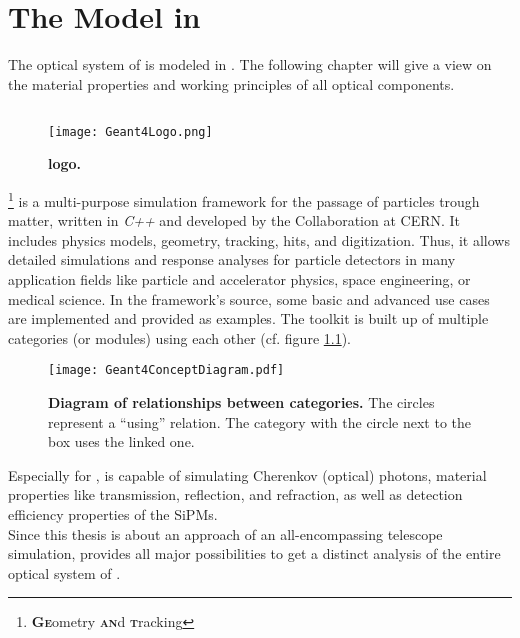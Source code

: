 \chapter{The \iceact Model in \geant}\label{chap:iceact_model}

The optical system of \iceact is modeled in \geant. The following chapter will give a view on the material properties and working principles of all optical components.

\section{\geant}

\begin{wrapfigure}{r}{0.5\textwidth}
	\centering
	\texttt{[image: Geant4Logo.png]}
	\caption[\geant logo]{\textbf{\geant logo.} \cite{geant4:logo}}	
\end{wrapfigure}
\geant\footnote{\textbf{\textsc{Ge}}ometry \textbf{\textsc{an}}d \textbf{\textsc{t}}racking} is a multi-purpose simulation framework for the passage of particles trough matter, written in \textit{C++} and developed by the \geant Collaboration at CERN. It includes physics models, geometry, tracking, hits, and digitization. Thus, it allows detailed simulations and response analyses for particle detectors in many application fields like particle and accelerator physics, space engineering, or medical science. In the framework's source, some basic and advanced use cases are implemented and provided as examples. The toolkit is built up of multiple categories (or modules) using each other (cf. figure \ref{geant4:categories}).~\cite{geant4}\\

\begin{figure}[H]
	\centering
	\texttt{[image: Geant4ConceptDiagram.pdf]}
	\caption[\geant category diagram]{\textbf{Diagram of relationships between \geant categories.} \cite[adapted]{geant4} The circles represent a \enquote{using} relation. The category with the circle next to the box uses the linked one.}	
	\label{geant4:categories}
\end{figure}

Especially for \iceact, \geant is capable of simulating Cherenkov (optical) photons, material properties like transmission, reflection, and refraction, as well as detection efficiency properties of the SiPMs.\\

Since this thesis is about an approach of an all-encompassing telescope simulation, \geant provides all major possibilities to get a distinct analysis of the entire optical system of \iceact.

